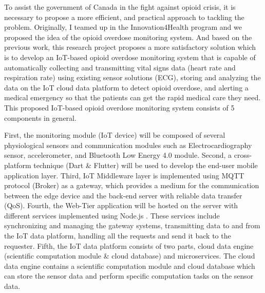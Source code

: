 \documentclass[conference]{IEEEtran}
\begin{document}
To assist the government of Canada in the fight against opioid crisis, it is necessary to propose a more efficient, and practical approach to tackling the problem. Originally, I teamed up in the Innovation4Health program and we proposed the idea of the opioid overdose monitoring system. And based on the previous work, this research project proposes a more satisfactory solution which is to develop an IoT-based opioid overdose monitoring system that is capable of automatically collecting and transmitting vital signs data (heart rate and respiration rate) using existing sensor solutions (ECG), storing and analyzing the data on the IoT cloud data platform to detect opioid overdose, and alerting a medical emergency so that the patients can get the rapid medical care they need. This proposed IoT-based opioid overdose monitoring system consists of 5 components in general. 

First, the monitoring module (IoT device) will be composed of several physiological sensors and communication modules such as Electrocardiography sensor, accelerometer, and Bluetooth Low Energy 4.0 module. Second, a cross-platform technique (Dart \& Flutter) will be used to develop the end-user mobile application layer. Third, IoT Middleware layer is implemented using MQTT protocol (Broker) as a gateway, which provides a medium for the communication between the edge device and the back-end server with reliable data transfer (QoS). Fourth, the Web-Tier application will be hosted on the server with different services implemented using Node.js \cite{ref5}. These services include synchronizing and managing the gateway systems, transmitting data to and from the IoT data platform, handling all the requests and send it back to the requester. Fifth, the IoT data platform consists of two parts, cloud data engine (scientific computation module \& cloud database) and microservices. The cloud data engine contains a scientific computation module and cloud database which can store the sensor data and perform specific computation tasks on the sensor data. 


\end{document}

